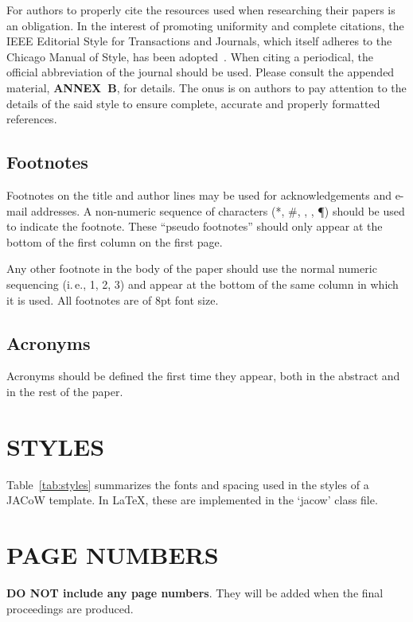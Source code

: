 For authors to properly cite the resources used when researching
their papers is an obligation. In the interest of
promoting uniformity and complete citations, the IEEE
Editorial Style for Transactions and Journals, which itself 
adheres to the Chicago Manual of Style, has been adopted~\cite{IEEE}. 
When citing a periodical, the official abbreviation of the journal 
should be used\cite{journal-abbreviations}.
Please consult the appended material, \textbf{ANNEX~B},
for details. The onus is on authors to pay attention to
the details of the said style to ensure complete, accurate
and properly formatted references.



\subsection{Footnotes}

Footnotes on the title and author lines may be used for acknowledgements
and e-mail addresses. A non-numeric sequence of characters (*, \#,
\dag, \ddag, \P) should be used to indicate the footnote.
These “pseudo footnotes” should only
appear at the bottom of the first column on the first page.

Any other footnote in the body of the paper should
use the normal numeric sequencing (i.\,e., 1, 2, 3)
and appear at the bottom of the same column in which
it is used.  All footnotes are of 8pt font size.

\subsection{Acronyms}

Acronyms should be defined the first time they appear, 
both in the abstract and in the rest of the paper. 

\section{STYLES}

Table~\ref{tab:styles} summarizes the fonts and spacing used in the styles of
a JACoW template. In \LaTeX, these 
are implemented in the ‘jacow’ class file.

\section{PAGE NUMBERS}

\textbf{DO NOT include any page numbers}. They will be added
when the final proceedings are produced.

